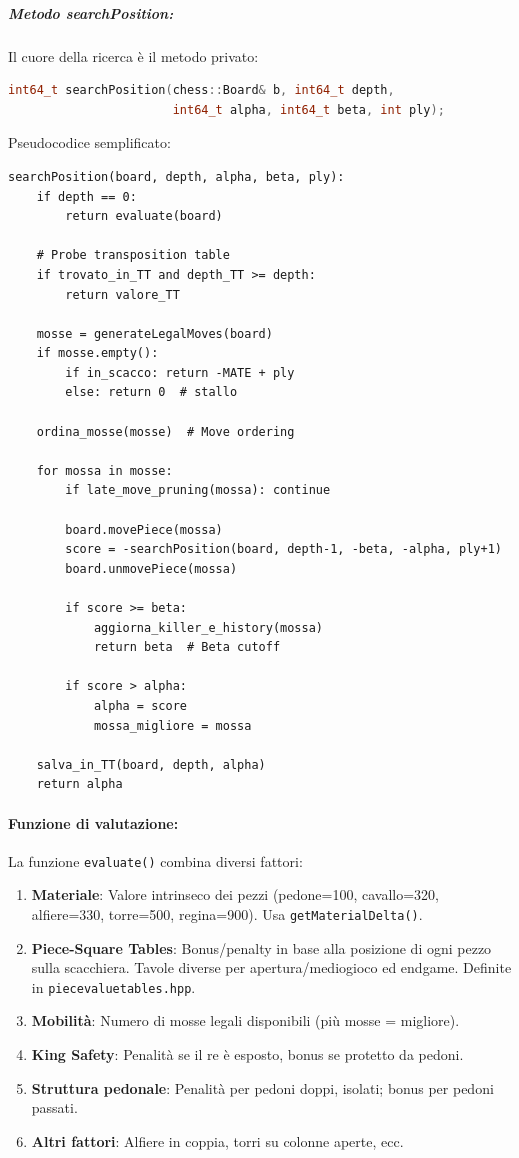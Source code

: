 \subparagraph{Metodo searchPosition:}
Il cuore della ricerca è il metodo privato:
\begin{lstlisting}[language=C++]
int64_t searchPosition(chess::Board& b, int64_t depth,
                       int64_t alpha, int64_t beta, int ply);
\end{lstlisting}

Pseudocodice semplificato:
\begin{verbatim}
searchPosition(board, depth, alpha, beta, ply):
    if depth == 0:
        return evaluate(board)

    # Probe transposition table
    if trovato_in_TT and depth_TT >= depth:
        return valore_TT

    mosse = generateLegalMoves(board)
    if mosse.empty():
        if in_scacco: return -MATE + ply
        else: return 0  # stallo

    ordina_mosse(mosse)  # Move ordering

    for mossa in mosse:
        if late_move_pruning(mossa): continue

        board.movePiece(mossa)
        score = -searchPosition(board, depth-1, -beta, -alpha, ply+1)
        board.unmovePiece(mossa)

        if score >= beta:
            aggiorna_killer_e_history(mossa)
            return beta  # Beta cutoff

        if score > alpha:
            alpha = score
            mossa_migliore = mossa

    salva_in_TT(board, depth, alpha)
    return alpha
\end{verbatim}

\paragraph{Funzione di valutazione:}

La funzione \texttt{evaluate()} combina diversi fattori:

\begin{enumerate}
  \item \textbf{Materiale}: Valore intrinseco dei pezzi (pedone=100, cavallo=320, alfiere=330,
        torre=500, regina=900). Usa \texttt{getMaterialDelta()}.

  \item \textbf{Piece-Square Tables}: Bonus/penalty in base alla posizione di ogni pezzo sulla scacchiera.
        Tavole diverse per apertura/mediogioco ed endgame. Definite in \texttt{piecevaluetables.hpp}.

  \item \textbf{Mobilità}: Numero di mosse legali disponibili (più mosse = migliore).

  \item \textbf{King Safety}: Penalità se il re è esposto, bonus se protetto da pedoni.

  \item \textbf{Struttura pedonale}: Penalità per pedoni doppi, isolati; bonus per pedoni passati.

  \item \textbf{Altri fattori}: Alfiere in coppia, torri su colonne aperte, ecc.
\end{enumerate}

